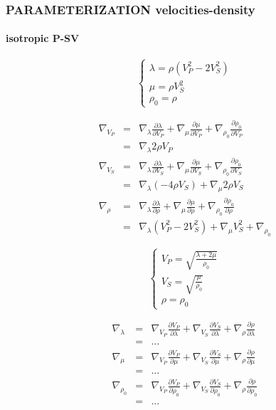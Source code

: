 \documentclass[9pt]{beamer}
\newcommand{\partderi}[2]{\frac{\partial#1}{\partial#2}}
\begin{document}
\begin{frame}\frametitle{PARAMETERIZATION velocities-density}
\framesubtitle{isotropic P-SV}
  
  \begin{minipage}{0.5\linewidth}
    \[\left\{ \begin{array}{l}
      \lambda = \rho (V_P^2-2V_S^2) \\
      \mu    = \rho V_S^2 \\
      \rho_0 = \rho 
    \end{array} \right.\]
    
    \begin{eqnarray}
      \nabla_{V_P} &=& \nabla_\lambda \partderi{\lambda}{V_P} + \nabla_\mu \partderi{\mu}{V_P} + \nabla_{\rho_0} \partderi{\rho_0}{V_P} \nonumber\\
                   &=& \nabla_\lambda 2\rho V_P \nonumber\\
      \nabla_{V_S} &=& \nabla_\lambda \partderi{\lambda}{V_S} + \nabla_\mu \partderi{\mu}{V_S} + \nabla_{\rho_0} \partderi{\rho_0}{V_S} \nonumber\\
                   &=& \nabla_\lambda (-4\rho V_S) + \nabla_\mu 2\rho V_S \nonumber\\
      \nabla_{\rho} &=& \nabla_\lambda \partderi{\lambda}{\rho} + \nabla_\mu \partderi{\mu}{\rho} + \nabla_{\rho_0} \partderi{\rho_0}{\rho} \nonumber\\
		    &=& \nabla_\lambda (V_P^2-2V_S^2) + \nabla_\mu V_S^2 + \nabla_{\rho_0} \nonumber
    \end{eqnarray}

  \end{minipage} \vline
  \begin{minipage}{0.45\linewidth}
    \[\left\{ \begin{array}{l}
      V_P  = \sqrt{\frac{\lambda+2\mu}{\rho_0}} \\
      V_S  = \sqrt{\frac{\mu}{\rho_0}} \\
      \rho = \rho_0
    \end{array} \right.\]
    
    \begin{eqnarray}
      \nabla_{\lambda}&=& \nabla_{V_P} \partderi{V_P}{\lambda} + \nabla_{V_S} \partderi{V_S}{\lambda} + \nabla_{\rho} \partderi{\rho}{\lambda} \nonumber\\
                      &=& ... \nonumber\\
      \nabla_{\mu}    &=& \nabla_{V_P} \partderi{V_P}{\mu}     + \nabla_{V_S} \partderi{V_S}{\mu}     + \nabla_{\rho} \partderi{\rho}{\mu} \nonumber\\
		      &=& ... \nonumber\\
      \nabla_{\rho_0} &=& \nabla_{V_P} \partderi{V_P}{\rho_0}  + \nabla_{V_S} \partderi{V_S}{\rho_0}  + \nabla_{\rho} \partderi{\rho}{\rho_0} \nonumber\\
		      &=& ... \nonumber
    \end{eqnarray}
  \end{minipage}

\end{frame}
\end{document}
